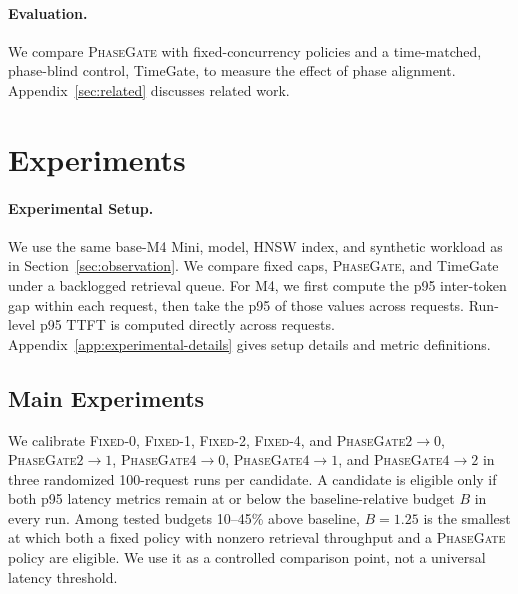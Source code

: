 \documentclass{article}
\newcommand{\system}{\textsc{PhaseGate}\xspace}
\newcommand{\fixed}[1]{\textsc{Fixed}-#1}
\newcommand{\gate}[2]{\system $#1{\rightarrow}#2$}
\begin{document}
\paragraph{Evaluation.}
We compare \system with fixed-concurrency policies and a time-matched, phase-blind control, TimeGate, to measure the effect of phase alignment.
Appendix~\ref{sec:related} discusses related work.

\section{Experiments}

\paragraph{Experimental Setup.}
We use the same base-M4 Mini, model, HNSW index, and synthetic workload as in Section~\ref{sec:observation}.
We compare fixed caps, \system, and TimeGate under a backlogged retrieval queue.
For M4, we first compute the p95 inter-token gap within each request, then take the p95 of those values across requests.
Run-level p95 TTFT is computed directly across requests.
Appendix~\ref{app:experimental-details} gives setup details and metric definitions.

\subsection{Main Experiments}
\FloatBarrier

We calibrate \fixed{0}, \fixed{1}, \fixed{2}, \fixed{4}, and \gate{2}{0}, \gate{2}{1}, \gate{4}{0}, \gate{4}{1}, and \gate{4}{2} in three randomized 100-request runs per candidate.
A candidate is eligible only if both p95 latency metrics remain at or below the baseline-relative budget $B$ in every run.
Among tested budgets 10--45\% above baseline, $B=1.25$ is the smallest at which both a fixed policy with nonzero retrieval throughput and a \system policy are eligible.
We use it as a controlled comparison point, not a universal latency threshold.
\end{document}
